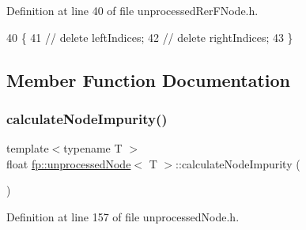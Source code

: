 Definition at line 40 of file unprocessed\+Rer\+F\+Node.\+h.


\begin{DoxyCode}
40                                   \{
41             \textcolor{comment}{//  delete leftIndices;}
42             \textcolor{comment}{//  delete rightIndices;}
43                 \}
\end{DoxyCode}


\subsection{Member Function Documentation}
\mbox{\label{classfp_1_1unprocessedNode_a0278b4dd8d905d38d75ced9a95839a12}} 
\subsubsection{\texorpdfstring{calculate\+Node\+Impurity()}{calculateNodeImpurity()}\hspace{0.1cm}{\footnotesize\ttfamily [1/2]}}
{\footnotesize\ttfamily template$<$typename T $>$ \\
float \hyperlink{classfp_1_1unprocessedNode}{fp\+::unprocessed\+Node}$<$ T $>$\+::calculate\+Node\+Impurity (\begin{DoxyParamCaption}{ }\end{DoxyParamCaption})\hspace{0.3cm}{\ttfamily [inline]}}



Definition at line 157 of file unprocessed\+Node.\+h.


